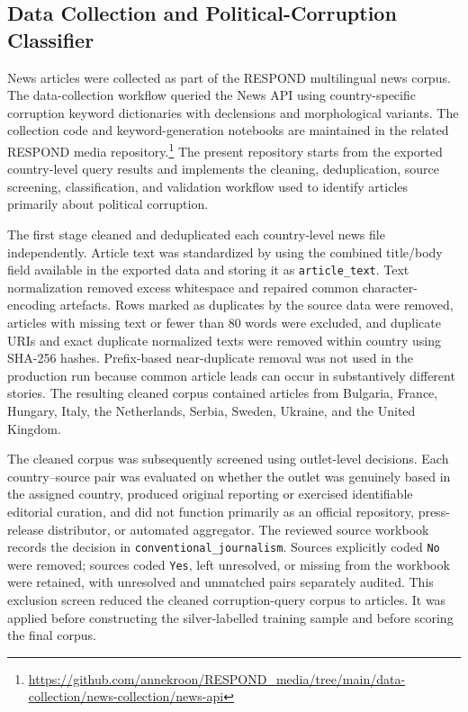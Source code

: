 \subsection{Data Collection and Political-Corruption Classifier}
\label{sec:method-political-classifier}



News articles were collected as part of the RESPOND multilingual news corpus. The data-collection workflow queried the News API using country-specific corruption keyword dictionaries with declensions and morphological variants. The collection code and keyword-generation notebooks are maintained in the related RESPOND media repository.\footnote{\url{https://github.com/annekroon/RESPOND_media/tree/main/data-collection/news-collection/news-api}} The present repository starts from the \PCRawQueryN{} exported country-level query results and implements the cleaning, deduplication, source screening, classification, and validation workflow used to identify articles primarily about political corruption.

The first stage cleaned and deduplicated each country-level news file independently. Article text was standardized by using the combined title/body field available in the exported data and storing it as \texttt{article\_text}. Text normalization removed excess whitespace and repaired common character-encoding artefacts. Rows marked as duplicates by the source data were removed, articles with missing text or fewer than 80 words were excluded, and duplicate URIs and exact duplicate normalized texts were removed within country using SHA-256 hashes. Prefix-based near-duplicate removal was not used in the production run because common article leads can occur in substantively different stories. The resulting cleaned corpus contained \PCCleanedQueryN{} articles from Bulgaria, France, Hungary, Italy, the Netherlands, Serbia, Sweden, Ukraine, and the United Kingdom.

The cleaned corpus was subsequently screened using outlet-level decisions. Each country--source pair was evaluated on whether the outlet was genuinely based in the assigned country, produced original reporting or exercised identifiable editorial curation, and did not function primarily as an official repository, press-release distributor, or automated aggregator. The reviewed source workbook records the decision in \texttt{conventional\_journalism}. Sources explicitly coded \texttt{No} were removed; sources coded \texttt{Yes}, left unresolved, or missing from the workbook were retained, with unresolved and unmatched pairs separately audited. This exclusion screen reduced the cleaned corruption-query corpus to \PCSourceFilteredN{} articles. It was applied before constructing the silver-labelled training sample and before scoring the final corpus.


